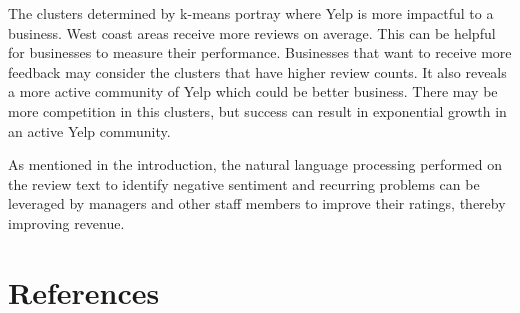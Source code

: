 \quad The clusters determined by k-means portray where Yelp is more impactful to a business. West coast areas receive more reviews on average. This can be helpful for businesses to measure their performance. Businesses that want to receive more feedback may consider the clusters that have higher review counts. It also reveals a more active community of Yelp which could be better business. There may be more competition in this clusters, but success can result in exponential growth in an active Yelp community.

\quad As mentioned in the introduction, the natural language processing performed on the review text to identify negative sentiment and recurring problems can be leveraged by managers and other staff members to improve their ratings, thereby improving revenue.

\section{References}

